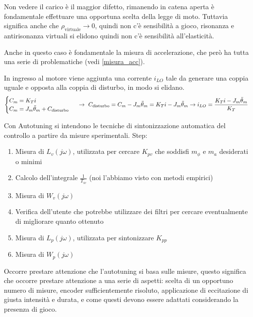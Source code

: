 Non vedere il carico è il maggior difetto, rimanendo in catena aperta è fondamentale effettuare una opportuna scelta della legge di moto.
Tuttavia significa anche che \(\rho_\text{virtuale} \rightarrow 0\), quindi non c'è sensibilità a gioco, risonanza e antirisonanza virtuali si elidono quindi non c'è sensibilità all'elasticità.

Anche in questo caso è fondamentale la misura di accelerazione, che però ha tutta una serie di problematiche (vedi \ref{misura_acc}).

In ingresso al motore viene aggiunta una corrente \(i_{LO}\) tale da generare una coppia uguale e opposta alla coppia di disturbo, in modo si elidano.
\[\begin{cases}
    C_m = K_T i \\
    C_m = J_m \Ddot{\theta}_m + C_\text{disturbo}
\end{cases} \ \rightarrow \ C_\text{disturbo} = C_m - J_m \Ddot{\theta}_m = K_T i - J_m \Ddot{\theta}_m \rightarrow i_{LO} = \frac{K_T i - J_m \Ddot{\theta}_m}{K_T} \]  


Con Autotuning si intendono le tecniche di sintonizzazione automatica del controllo a partire da misure sperimentali.
Step:
\begin{enumerate}
    \item Misura di \(L_v(j\omega)\), utilizzata per cercare \(K_{pv}\) che soddisfi \(m_\phi\) e \(m_a\) desiderati o minimi
    \item Calcolo dell'integrale \(\frac{1}{T_{iv}}\) (noi l'abbiamo visto con metodi empirici)
    \item Misura di \(W_v(j\omega)\)
    \item Verifica dell'utente che potrebbe utilizzare dei filtri per cercare eventualmente di migliorare quanto ottenuto
    \item Misura di \(L_p(j\omega)\), utilizzata per sintonizzare \(K_{pp}\)
    \item Misura di \(W_p(j\omega)\)
\end{enumerate}

Occorre prestare attenzione che l'autotuning si basa sulle misure, questo significa che occorre prestare attenzione a una serie di aspetti: scelta di un opportuno numero di misure, encoder sufficientemente risoluto, applicazione di eccitazione di giusta intensità e durata, e come questi devono essere adattati considerando la presenza di gioco. 